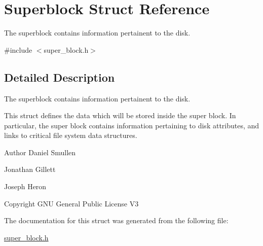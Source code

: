 \hypertarget{struct_superblock}{\section{Superblock Struct Reference}
\label{struct_superblock}
}


The superblock contains information pertainent to the disk.  




{\ttfamily \#include $<$super\-\_\-block.\-h$>$}



\subsection{Detailed Description}
The superblock contains information pertainent to the disk. 

This struct defines the data which will be stored inside the super block. In particular, the super block contains information pertaining to disk attributes, and links to critical file system data structures.

\begin{DoxyAuthor}{Author}
Daniel Smullen

Jonathan Gillett

Joseph Heron
\end{DoxyAuthor}
\begin{DoxyCopyright}{Copyright}
G\-N\-U General Public License V3 
\end{DoxyCopyright}


The documentation for this struct was generated from the following file\-:\begin{DoxyCompactItemize}
\item 
\hyperlink{super__block_8h}{super\-\_\-block.\-h}\end{DoxyCompactItemize}
